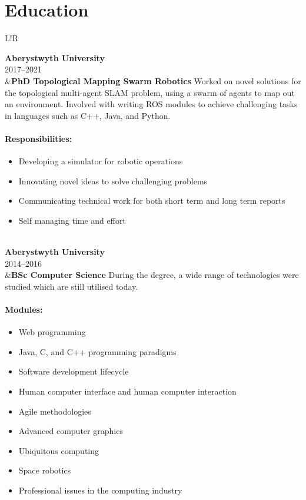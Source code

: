 \documentclass[10pt]{article}
\newcommand\VRule{\color{lightgray}\vrule width 0.5pt}
\begin{document}
\section*{Education}
\begin{longtable}{L!{\VRule}R}

{\bf Aberystwyth University}\\
2017--2021\\
&{\bf PhD Topological Mapping Swarm Robotics}\newline
Worked on novel solutions for the topological multi-agent SLAM problem, using a swarm of agents to map out an environment. Involved with writing ROS modules to achieve challenging tasks in languages such as C++, Java, and Python.

\vspace{-3mm}
\paragraph{Responsibilities:}
\begin{itemize}[noitemsep,topsep=0pt]
	\item Developing a simulator for robotic operations
	\item Innovating novel ideas to solve challenging problems
	\item Communicating technical work for both short term and long term reports
	\item Self managing time and effort
\end{itemize}
\\

{\bf Aberystwyth University}\\
2014--2016\\
&{\bf BSc Computer Science}\newline
During the degree, a wide range of technologies were studied which are still utilised today.

\vspace{-3mm}
\paragraph{Modules:}
\begin{itemize}[noitemsep,topsep=0pt]
    \item Web programming
    \item Java, C, and C++ programming paradigms
    \item Software development lifecycle
    \item Human computer interface and human computer interaction
    \item Agile methodologies
    \item Advanced computer graphics
    \item Ubiquitous computing
    \item Space robotics
    \item Professional issues in the computing industry
\end{itemize}
\\


\end{longtable}
\end{document}
